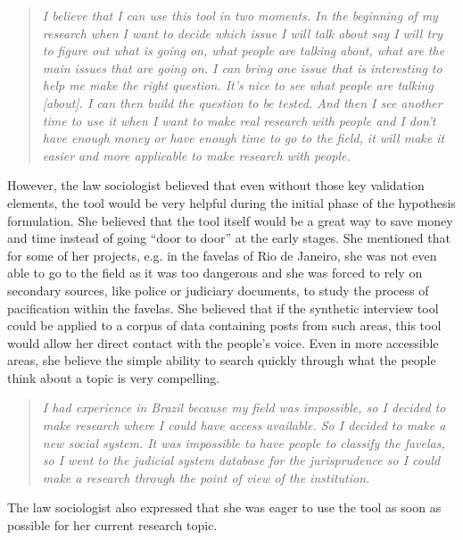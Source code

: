 \documentclass{sigchi}
\begin{document}

\begin{quote}
{\em
I believe that I can use this tool in two moments. In the beginning of my research when I want to decide which issue I will talk about say I will try to figure out what is going on, what people are talking about, what are the main issues that are going on. I can bring one issue that is interesting to help me make the right question. It's nice to see what people are talking [about]. I can then build the question to be tested. And then I see another time to use it when I want to make real research with people and I don't have enough money or have enough time to go to the field, it will make it easier and more applicable to make research with people. 
}\end{quote}

However, the law sociologist believed that even without those key validation elements, the tool would be very helpful during the initial phase of the hypothesis formulation. She believed that the tool itself would be a great way to save money and time instead of going ``door to door'' at the early stages. She mentioned that for some of her projects, e.g. in the favelas of Rio de Janeiro, she was not even able to go to the field as it was too dangerous and she was forced to rely on secondary sources, like police or judiciary documents, to study the process of pacification within the favelas. She believed that if the synthetic interview tool could be applied to a corpus of data containing posts from such areas, this tool would allow her direct contact with the people's voice. Even in more accessible areas, she believe the simple ability to search quickly through what the people think about a topic is very compelling. 

\begin{quote}
{\em
I had experience in Brazil because my field was impossible, so I decided to make research where I could have access available. So I decided to make a new social system. It was impossible to have people to classify the favelas, so I went to the judicial system database for the jurisprudence so I could make a research through the point of view of the institution.
}\end{quote}

The law sociologist also expressed that she was eager to use the tool as soon as possible for her current research topic.

\end{document}
